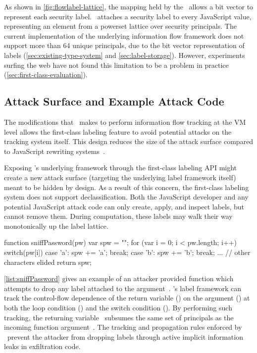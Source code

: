As shown in \autoref{fig:flowlabel-lattice}, the mapping held by the \FlowLabelRegistry\ allows a bit vector to represent each security label.
\FlowCore\ attaches a security label to every JavaScript value, representing an element from a powerset lattice over security principals.
The current implementation of the underlying information flow framework does not support more than 64 unique principals, due to the bit vector representation of labels (\autoref{sec:existing-type-system} and \autoref{sec:label-storage}).
However, experiments surfing the web have not found this limitation to be a problem in practice (\autoref{sec:first-class-evaluation}).

\subsection{Attack Surface and Example Attack Code}
\label{subsec:attack}

The modifications that \FlowCore\ makes to perform information flow tracking at the VM level allows the first-class labeling feature to avoid potential attacks on the tracking system itself.
This design reduces the size of the attack surface compared to JavaScript rewriting systems~\cite{chugh.etal+09, jang.etal+10}.

Exposing \FlowCore's underlying framework through the first-class labeling API might create a new attack surface (targeting the underlying label framework itself) meant to be hidden by design.
As a result of this concern, the first-class labeling system does not support declassification.
Both the JavaScript developer and any potential JavaScript attack code can only create, apply, and inspect labels, but cannot remove them.
During computation, these labels may walk their way monotonically up the label lattice.

\begin{jscode}
function sniffPassword(pw) {
  var spw = "";
  for (var i = 0; i < pw.length; i++) {
    switch(pw[i]) {
    case 'a': spw += 'a'; break;
    case 'b': spw += 'b'; break;
    ... // other characters elided
    }
  }
  return spw;
}
\end{jscode}

\autoref{list:sniffPassword} gives an example of an attacker provided function which attempts to drop any label attached to the argument~.
\FlowCore's label framework can track the control-flow dependence of the return variable () on the argument () at both the loop condition () and the switch condition ().
By performing such tracking, the returning variable~ subsumes the same set of principals as the incoming function argument~.
The tracking and propagation rules enforced by \FlowCore\ prevent the attacker from dropping labels through active implicit information leaks in exfiltration code.

